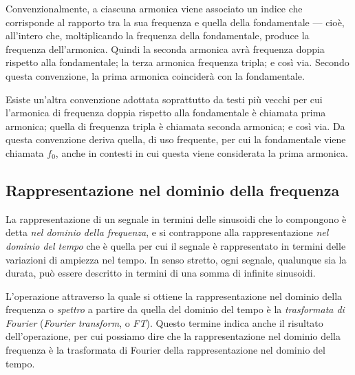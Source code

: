 Convenzionalmente, a ciascuna armonica viene associato un indice che corrisponde al rapporto tra la sua frequenza e quella della fondamentale --- cioè, all'intero che, moltiplicando la frequenza della fondamentale, produce la frequenza dell'armonica. Quindi la seconda armonica avrà frequenza doppia rispetto alla fondamentale; la terza armonica frequenza tripla; e così via. Secondo questa convenzione, la prima armonica coinciderà con la fondamentale.

Esiste un'altra convenzione adottata soprattutto da testi più vecchi per cui l'armonica di frequenza doppia rispetto alla fondamentale è chiamata prima armonica; quella di frequenza tripla è chiamata seconda armonica; e così via. Da questa convenzione deriva quella, di uso frequente, per cui la fondamentale viene chiamata $f_0$, anche in contesti in cui questa viene considerata la prima armonica.






\subsection{Rappresentazione nel dominio della frequenza}

La rappresentazione di un segnale in termini delle sinusoidi che lo compongono è detta \emph{nel dominio della frequenza}, e si contrappone alla rappresentazione \emph{nel dominio del tempo} che è quella per cui il segnale è rappresentato in termini delle variazioni di ampiezza nel tempo. In senso stretto, ogni segnale, qualunque sia la durata, può essere descritto in termini di una somma di infinite sinusoidi. 

L'operazione attraverso la quale si ottiene la rappresentazione nel dominio della frequenza o \emph{spettro} a partire da quella del dominio del tempo è la \emph{trasformata di Fourier} (\emph{Fourier transform}, o \emph{FT}). Questo termine indica anche il risultato dell'operazione, per cui possiamo dire che la rappresentazione nel dominio della frequenza è la trasformata di Fourier della rappresentazione nel dominio del tempo. 

